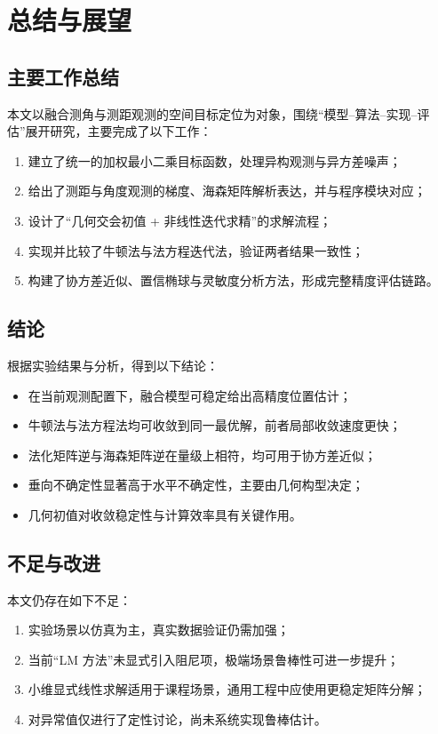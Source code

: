 \chapter{总结与展望}

\section{主要工作总结}
本文以融合测角与测距观测的空间目标定位为对象，围绕“模型--算法--实现--评估”展开研究，主要完成了以下工作：
\begin{enumerate}
  \item 建立了统一的加权最小二乘目标函数，处理异构观测与异方差噪声；
  \item 给出了测距与角度观测的梯度、海森矩阵解析表达，并与程序模块对应；
  \item 设计了“几何交会初值 + 非线性迭代求精”的求解流程；
  \item 实现并比较了牛顿法与法方程迭代法，验证两者结果一致性；
  \item 构建了协方差近似、置信椭球与灵敏度分析方法，形成完整精度评估链路。
\end{enumerate}

\section{结论}
根据实验结果与分析，得到以下结论：
\begin{itemize}
  \item 在当前观测配置下，融合模型可稳定给出高精度位置估计；
  \item 牛顿法与法方程法均可收敛到同一最优解，前者局部收敛速度更快；
  \item 法化矩阵逆与海森矩阵逆在量级上相符，均可用于协方差近似；
  \item 垂向不确定性显著高于水平不确定性，主要由几何构型决定；
  \item 几何初值对收敛稳定性与计算效率具有关键作用。
\end{itemize}

\section{不足与改进}
本文仍存在如下不足：
\begin{enumerate}
  \item 实验场景以仿真为主，真实数据验证仍需加强；
  \item 当前“LM 方法”未显式引入阻尼项，极端场景鲁棒性可进一步提升；
  \item 小维显式线性求解适用于课程场景，通用工程中应使用更稳定矩阵分解；
  \item 对异常值仅进行了定性讨论，尚未系统实现鲁棒估计。
\end{enumerate}

